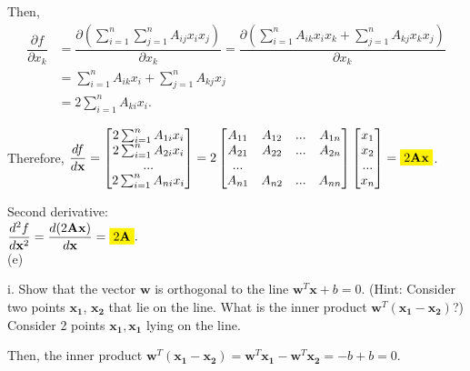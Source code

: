 \documentclass[12pt]{article}
\begin{document}
Then, 
\begin{align*}
\dfrac{\partial f}{\partial x_k} &=  \dfrac{\partial(\sum_{i = 1}^n \sum_{j = 1}^n A_{ij} x_i x_j)}{\partial x_k} = \dfrac{\partial(\sum_{i=1}^n A_{ik}x_ix_k +  \sum_{j=1}^n A_{kj}x_kx_j )}{\partial x_k}\\
&= \sum_{i=1}^n A_{ik}x_i +  \sum_{j=1}^n A_{kj}x_j\\
&= 2\sum_{i=1}^n A_{ki}x_i.
\end{align*}

Therefore, $\dfrac{df}{d\mathbf{x}} = \begin{bmatrix} 2\sum_{i=1}^n A_{1i}x_i \\ 2\sum_{i=1}^n A_{2i}x_i \\ ... \\ 2\sum_{i=1}^n A_{ni}x_i \\ \end{bmatrix} = 2\begin{bmatrix} A_{11} & A_{12} & ... & A_{1n} \\  A_{21} & A_{22} & ... & A_{2n}  \\ ... \\ A_{n1} & A_{n2} & ... & A_{nn}  \\ \end{bmatrix} \begin{bmatrix} x_1 \\ x_2 \\ ... \\ x_n \\\end{bmatrix} = \colorbox{yellow}{$2\mathbf{Ax}$}$.\\
\vspace{1.5em}

Second derivative:\\

$\dfrac{d^2f}{d\mathbf{x}^2} = \dfrac{d(2\mathbf{Ax})}{d\mathbf{x}} = \colorbox{yellow}{$2\mathbf{A}$}.$\\


\noindent(e)

i. Show that the vector $\mathbf{w}$ is orthogonal to the line $\mathbf{w}^T\mathbf{x} + b = 0$. (Hint: Consider two
points $\mathbf{x_1}$, $\mathbf{x_2}$ that lie on the line. What is the inner product $\mathbf{w}^T(\mathbf{x_1} - \mathbf{x_2})$?)\\

Consider 2 points $\mathbf{x_1}, \mathbf{x_1}$ lying on the line.

Then, the inner product $\mathbf{w}^T(\mathbf{x_1} - \mathbf{x_2}) = \mathbf{w}^T\mathbf{x_1} - \mathbf{w}^T\mathbf{x_2} = -b + b = 0$.
\end{document}
